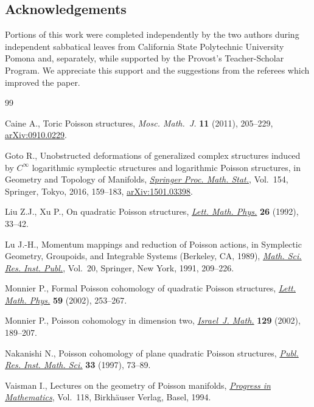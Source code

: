 \documentclass[10pt,a4paper]{amsart}
\numberwithin{equation}{section}
\begin{document}
\subsection*{Acknowledgements}

Portions of this work were completed independently by the two authors during independent sabbatical leaves from California State Polytechnic University Pomona and, separately, while supported by the Provost's Teacher-Scholar Program. We appreciate this support and the suggestions from the referees which improved the paper.


\begin{thebibliography}{99}
\footnotesize\itemsep=0pt

Caine A., Toric {P}oisson structures, \textit{Mosc. Math.~J.} \textbf{11}
 (2011), 205--229, \href{http://arxiv.org/abs/0910.0229}{arXiv:0910.0229}.

Goto R., Unobstructed deformations of generalized complex structures induced by
 {$C^\infty$} logarithmic symplectic structures and logarithmic {P}oisson
 structures, in Geometry and Topology of Manifolds, \href{https://doi.org/10.1007/978-4-431-56021-0_9}{\textit{Springer Proc.
 Math. Stat.}}, Vol.~154, Springer, Tokyo, 2016, 159--183, \href{http://arxiv.org/abs/1501.03398}{arXiv:1501.03398}.

Liu Z.J., Xu P., On quadratic {P}oisson structures, \href{https://doi.org/10.1007/BF00420516}{\textit{Lett. Math. Phys.}}
 \textbf{26} (1992), 33--42.

Lu J.-H., Momentum mappings and reduction of {P}oisson actions, in Symplectic
 Geometry, Groupoids, and Integrable Systems ({B}erkeley, {CA}, 1989),
 \href{https://doi.org/10.1007/978-1-4613-9719-9_15}{\textit{Math. Sci. Res. Inst. Publ.}}, Vol.~20, Springer, New York, 1991,
 209--226.

Monnier P., Formal {P}oisson cohomology of quadratic {P}oisson structures,
 \href{https://doi.org/10.1023/A:1015513632414}{\textit{Lett. Math. Phys.}} \textbf{59} (2002), 253--267.

Monnier P., Poisson cohomology in dimension two, \href{https://doi.org/10.1007/BF02773163}{\textit{Israel~J. Math.}}
 \textbf{129} (2002), 189--207.

Nakanishi N., Poisson cohomology of plane quadratic {P}oisson structures,
 \href{https://doi.org/10.2977/prims/1195145534}{\textit{Publ. Res. Inst. Math. Sci.}} \textbf{33} (1997), 73--89.

Vaisman I., Lectures on the geometry of {P}oisson manifolds, \href{https://doi.org/10.1007/978-3-0348-8495-2}{\textit{Progress
 in Mathematics}}, Vol.~118, Birkh\"auser Verlag, Basel, 1994.

\end{thebibliography}
\end{document}
